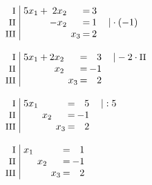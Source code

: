 \begin{equation*}
\begin{array}{l}
\begin{array}{r|rcrcrcrl}
\end{array}
\\ \\
\setlength{\arraycolsep}{1pt}
\begin{array}{r|rcrcrcrl}
    \text{\small I } &\; 5x_{1} & + & 2x_{2} &  &       & = & 3 &                 \\
   \text{\small II } &\;        &   & -x_{2} &  &       & = & 1 & \quad|\cdot(-1) \\
  \text{\small III } &\;        &   &        &  & x_{3} & = & 2 &                   
\end{array}
\\ \\
\setlength{\arraycolsep}{1pt}
\begin{array}{r|rcrcrcrl}
    \text{\small I } &\; 5x_{1} & + & 2x_{2} &  &       & = &  3 & \quad|-2\cdot\text{\small II} \\
   \text{\small II } &\;        &   &  x_{2} &  &       & = & -1 &                               \\
  \text{\small III } &\;        &   &        &  & x_{3} & = &  2 &                                 
\end{array}
\\ \\
\setlength{\arraycolsep}{1pt}
\begin{array}{r|rcrcrcrl}
    \text{\small I } &\; 5x_{1} &  &       &  &       & = &  5 & \quad|:5 \\
   \text{\small II } &\;        &  & x_{2} &  &       & = & -1 &          \\
  \text{\small III } &\;        &  &       &  & x_{3} & = &  2 &            
\end{array}
\\ \\
\setlength{\arraycolsep}{1pt}
\begin{array}{r|rcrcrcrl}
    \text{\small I } &\; x_{1} &  &       &  &       & = &  1 & \\
   \text{\small II } &\;       &  & x_{2} &  &       & = & -1 & \\
  \text{\small III } &\;       &  &       &  & x_{3} & = &  2 &   
\end{array}
\end{array}
\end{equation*}

